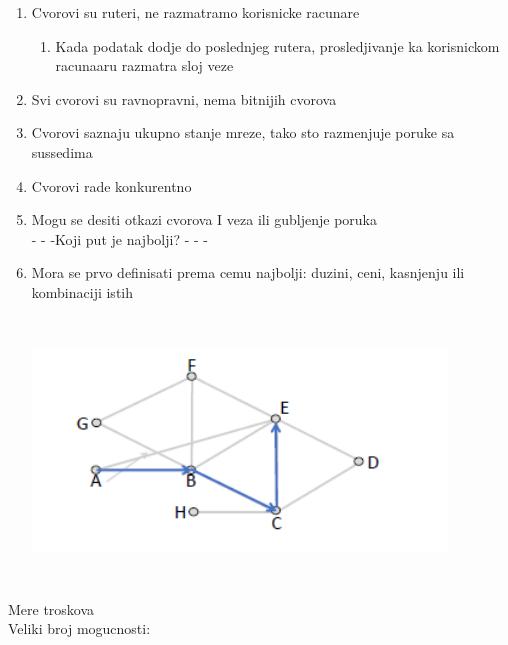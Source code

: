 \documentclass{article} %
\begin{document}
\begin{enumerate}
	\item Cvorovi su ruteri, ne razmatramo korisnicke racunare
	\begin{enumerate}
		\item Kada podatak dodje do poslednjeg rutera, prosledjivanje ka korisnickom racunaaru razmatra sloj veze
	\end{enumerate}
	\item Svi cvorovi su ravnopravni, nema bitnijih cvorova
	\item Cvorovi saznaju ukupno stanje mreze, tako sto razmenjuje poruke sa sussedima
	\item Cvorovi rade konkurentno
	\item Mogu se desiti otkazi cvorova I veza ili gubljenje poruka\\
	- - -Koji put je najbolji? - - -
	\item Mora se prvo definisati prema cemu najbolji: duzini, ceni, kasnjenju ili kombinaciji istih
	\begin{center}
		\includegraphics[width=11cm, height=7cm]{tema}\\
	\end{center}
\end{enumerate} 
Mere troskova\\
Veliki broj mogucnosti:
\end{document}
